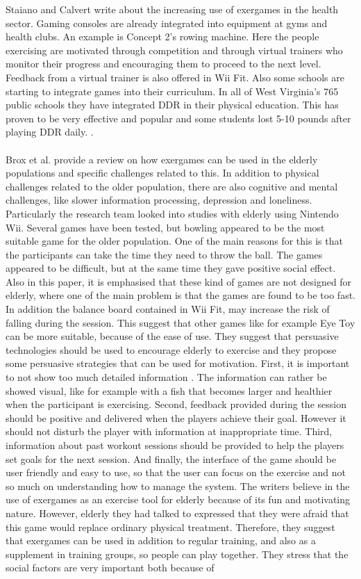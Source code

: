 Staiano and Calvert write about the increasing use of exergames in the health sector. Gaming consoles are already integrated into equipment at gyms and health clubs. An example is Concept 2’s rowing machine. Here the people exercising are motivated through competition and through virtual trainers who monitor their progress and encouraging them to proceed to the next level. Feedback from a virtual trainer is also offered in Wii Fit. Also some schools are starting to integrate games into their curriculum. In all of West Virginia’s 765 public schools they have integrated DDR in their physical education. This has proven to be very effective and popular and some students lost 5-10 pounds after playing DDR daily. \cite{staiano2011exergames}. \\ \\
Brox et al. \cite{exergamesforelderly} provide a review on how exergames can be used in the elderly populations and specific challenges related to this. In addition to physical challenges related to the older population, there are also cognitive and  mental challenges, like slower information processing, depression and loneliness. Particularly the research team  looked into studies with elderly using Nintendo Wii. Several games have been tested, but bowling appeared to be the most suitable game for the older population. One of the main reasons for this is that the participants can take the time they need to throw the ball. The games appeared to be difficult, but at the same time they gave positive social effect. Also in this paper, it is emphasised that these kind of games are not designed for elderly, where one of the main problem is that the games are found to be too fast. In addition the balance board contained in Wii Fit, may increase the risk of falling during the session. This suggest that other games like  for example Eye Toy can  be more suitable, because of the ease of use. They suggest that persuasive technologies should be used to encourage elderly to exercise and they propose some persuasive strategies that can be used for motivation. First, it is important to not show too much  detailed information . The information can rather be showed visual, like for example with a fish that becomes larger and healthier when the participant is exercising. Second, feedback provided during the session should be positive and delivered when the players achieve their goal. However it should not disturb the player with information at inappropriate time. Third, information about past workout sessions should be  provided to help the players set goals for the next session. And finally, the interface of the game should be user friendly and easy to use, so that the user can focus on the exercise and not so much on understanding how to manage the system.  The writers  believe in the use of  exergames as an exercise tool for elderly because of its fun and motivating nature. However, elderly they had talked to expressed that they were afraid that this game would replace ordinary physical treatment. Therefore, they suggest that exergames can be used in addition to regular training, and also as a supplement in training groups, so people can play together. They stress that the social factors are very important  both because of 